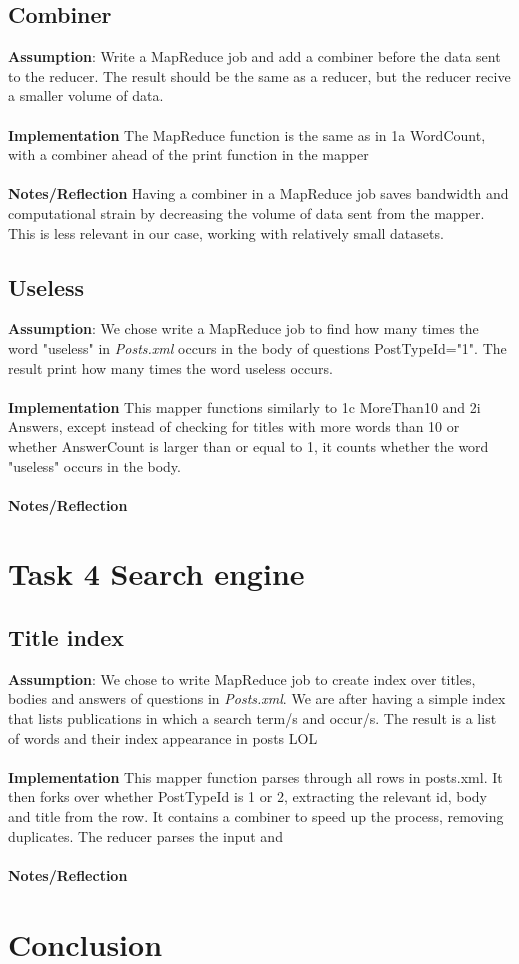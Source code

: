 \documentclass[fleqn,10pt]{wlscirep}
\begin{document}
\subsection{Combiner}
\textbf{Assumption}: Write a MapReduce job and add a combiner before  the data sent to the reducer. The result should be the same as a reducer, but the reducer recive a smaller volume of data.  \\ \\
\textbf{Implementation} The MapReduce function is the same as in 1a WordCount, with a combiner ahead of the print function in the mapper \\ \\
\textbf{Notes/Reflection} Having a combiner in a MapReduce job saves bandwidth and computational strain by decreasing the volume of data sent from the mapper. This is less relevant in our case, working with relatively small datasets.


\subsection{Useless}
\textbf{Assumption}:  We chose write a MapReduce job  to find how many times the word "useless" in \textit{Posts.xml} occurs in the body of questions PostTypeId="1". The result print how many times the word useless occurs.  \\ \\
\textbf{Implementation} This mapper functions similarly to 1c MoreThan10 and 2i Answers, except instead of checking for titles with more words than 10 or whether AnswerCount is larger than or equal to 1, it counts whether the word "useless" occurs in the body. \\ \\
\textbf{Notes/Reflection}

\section{Task 4 Search engine}
\subsection{Title index}
\textbf{Assumption}: We chose to write MapReduce job to create index over titles, bodies and answers of questions in \textit{Posts.xml}. We are after having a simple index that lists publications in which a search term/s and occur/s. The result is a list of words and their index appearance in posts LOL \\ \\
\textbf{Implementation} This mapper function parses through all rows in posts.xml. It then forks over whether PostTypeId is 1 or 2, extracting the relevant id, body and title from the row. It contains a combiner to speed up the process, removing duplicates. The reducer parses the input and  \\ \\
\textbf{Notes/Reflection}




\section*{Conclusion}
\end{document}
